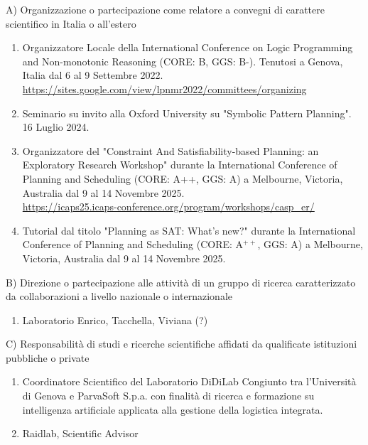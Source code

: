 \documentclass{resume} %
\begin{document}

\begin{rSectionLower}{A) Organizzazione o partecipazione come relatore a convegni di carattere scientifico in Italia o all'estero}
	\begin{enumerate}
		\item Organizzatore Locale della International Conference on Logic Programming and Non-monotonic Reasoning (CORE: B, GGS: B-). Tenutosi a Genova, Italia dal 6 al 9 Settembre 2022. \\\url{https://sites.google.com/view/lpnmr2022/committees/organizing}
		\item Seminario su invito alla Oxford University su "Symbolic Pattern Planning". 16 Luglio 2024.
		\item Organizzatore del "Constraint And Satisfiability-based Planning: an Exploratory Research Workshop" durante la International Conference of Planning and Scheduling (CORE: A++, GGS: A) a Melbourne, Victoria, Australia dal 9 al 14 Novembre 2025. \\\url{https://icaps25.icaps-conference.org/program/workshops/casp_er/}
		\item Tutorial dal titolo "Planning as SAT: What’s new?" durante la International Conference of Planning and Scheduling (CORE: A$^{++}$, GGS: A) a Melbourne, Victoria, Australia dal 9 al 14 Novembre 2025.
	\end{enumerate}
\end{rSectionLower}

\begin{rSectionLower}{B) Direzione o partecipazione alle attività di un gruppo di ricerca caratterizzato da collaborazioni a livello nazionale o internazionale}
	\begin{enumerate}
		\item Laboratorio Enrico, Tacchella, Viviana (?)
	\end{enumerate}
\end{rSectionLower}

\begin{rSectionLower}{C) Responsabilità di studi e ricerche scientifiche affidati da qualificate istituzioni pubbliche o private}
	\begin{enumerate}
		\item Coordinatore Scientifico del Laboratorio DiDiLab Congiunto tra l'Università di Genova e ParvaSoft S.p.a. con finalità di ricerca e formazione su intelligenza artificiale applicata alla gestione della logistica integrata.	
		\item Raidlab, Scientific Advisor
	\end{enumerate}
\end{rSectionLower}
\end{document}
